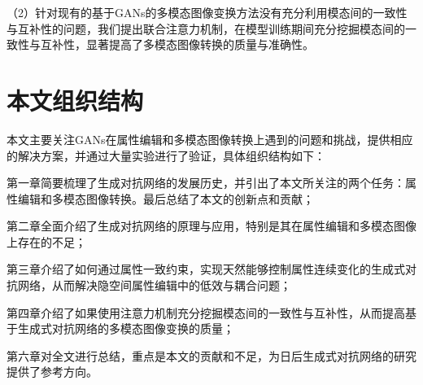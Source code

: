 （2）针对现有的基于GANs的多模态图像变换方法没有充分利用模态间的一致性与互补性的问题，我们提出联合注意力机制，在模型训练期间充分挖掘模态间的一致性与互补性，显著提高了多模态图像转换的质量与准确性。

\section{本文组织结构}

本文主要关注GANs在属性编辑和多模态图像转换上遇到的问题和挑战，提供相应的解决方案，并通过大量实验进行了验证，具体组织结构如下：

第一章简要梳理了生成对抗网络的发展历史，并引出了本文所关注的两个任务：属性编辑和多模态图像转换。最后总结了本文的创新点和贡献；

第二章全面介绍了生成对抗网络的原理与应用，特别是其在属性编辑和多模态图像上存在的不足；

第三章介绍了如何通过属性一致约束，实现天然能够控制属性连续变化的生成式对抗网络，从而解决隐空间属性编辑中的低效与耦合问题；

第四章介绍了如果使用注意力机制充分挖掘模态间的一致性与互补性，从而提高基于生成式对抗网络的多模态图像变换的质量；

第六章对全文进行总结，重点是本文的贡献和不足，为日后生成式对抗网络的研究提供了参考方向。
